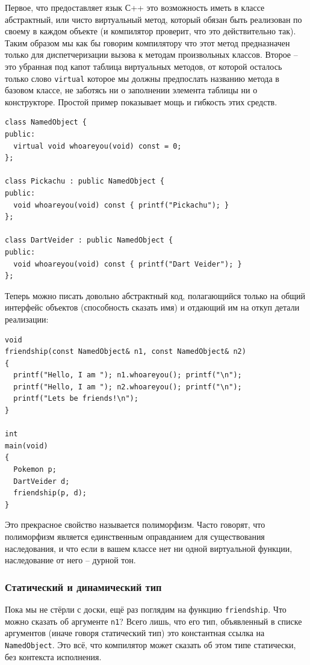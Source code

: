 \documentclass[a4paper,12pt,oneside]{article}
\begin{document}
Первое, что предоставляет язык С++ это возможность иметь в классе абстрактный, или чисто виртуальный метод, который обязан быть реализован по своему в каждом объекте (и компилятор проверит, что это действительно так). Таким образом мы как бы говорим компилятору что этот метод предназначен только для диспетчеризации вызова к методам произвольных классов. Второе -- это убранная под капот таблица виртуальных методов, от которой осталось только слово \lstinline!virtual! которое мы должны предпослать названию метода в базовом классе, не заботясь ни о заполнении элемента таблицы ни о конструкторе. Простой пример показывает мощь и гибкость этих средств.

\begin{lstlisting}
class NamedObject {
public:
  virtual void whoareyou(void) const = 0;
};

class Pickachu : public NamedObject {
public:
  void whoareyou(void) const { printf("Pickachu"); }
};

class DartVeider : public NamedObject {
public:
  void whoareyou(void) const { printf("Dart Veider"); }
};
\end{lstlisting}

Теперь можно писать довольно абстрактный код, полагающийся только на общий интерфейс объектов (способность сказать имя) и отдающий им на откуп детали реализации:

\begin{lstlisting}
void 
friendship(const NamedObject& n1, const NamedObject& n2)
{
  printf("Hello, I am "); n1.whoareyou(); printf("\n");
  printf("Hello, I am "); n2.whoareyou(); printf("\n");
  printf("Lets be friends!\n");
}

int 
main(void)
{
  Pokemon p;
  DartVeider d;
  friendship(p, d);
}
\end{lstlisting}

Это прекрасное свойство называется полиморфизм. Часто говорят, что полиморфизм является единственным оправданием для существования наследования, и что если в вашем классе нет ни одной виртуальной функции, наследование от него – дурной тон. 

\subsubsection{Статический и динамический тип}

Пока мы не стёрли с доски, ещё раз поглядим на функцию \lstinline!friendship!. Что можно сказать об аргументе \lstinline!n1!? Всего лишь, что его тип, объявленный в списке аргументов (иначе говоря статический тип) это константная ссылка на \lstinline!NamedObject!. Это всё, что компилятор может сказать об этом типе статически, без контекста исполнения.
\end{document}
